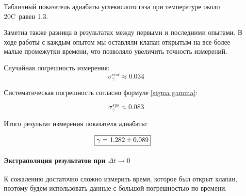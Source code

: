 \documentclass[a4paper,12pt]{report}
\begin{document}
\begin{multicols}{2}
    Табличный показатель адиабаты углекислого газа при температуре около 20C\degree \ равен 1.3. 
    
    Заметна также разница в результатах между первыми и последними опытами. В ходе работы с каждым опытом мы оставляли клапан открытым на все более малые промежутки времени, что позволяло увеличить точность измерений.

    Случайная погрешность измерения:
    \begin{equation*}
        \sigma_\gamma^{rnd}\approx0.034
    \end{equation*}

    Систематическая погрешность согласно формуле \eqref{sigma gamma}:

    \begin{equation*}
        \sigma_\gamma^{sys}\approx0.083
    \end{equation*}

    Итого результат измерения показателя адиабаты:

    \begin{align}
        \Aboxed{\gamma =& 1.282 \pm 0.089}
    \end{align}

    \paragraph*{Экстраполяция результатов при $\Delta t \rightarrow 0$}
    К сожалению достаточно сложно измерить время, которое был открыт клапан, поэтому будем использовать данные с большой погрешностью по времени. 


\end{multicols}
\end{document}
